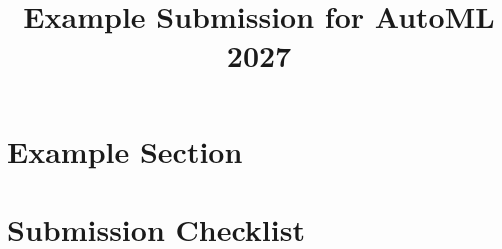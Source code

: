 \documentclass[11pt]{article}
\title{Example Submission for AutoML 2027}
\author[1]{\nameemail{Author 1}{email1@example.com}}
\affil[1]{Institution 1}
\begin{document}
\maketitle

\begin{abstract}
\end{abstract}


\section{Example Section}

\begin{acknowledgements}
\end{acknowledgements}


% 




\newpage
\section*{Submission Checklist}

\end{document}
